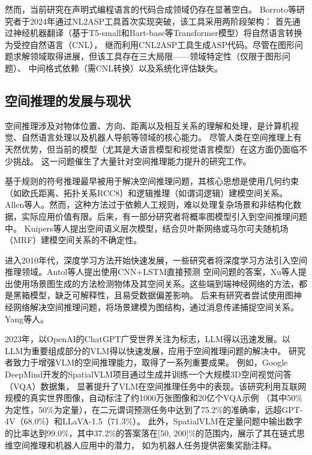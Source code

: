 然而，当前研究在声明式编程语言的代码合成领域仍存在显著空白。
Borroto等研究者于2024年通过NL2ASP工具首次实现突破，该工具采用两阶段架构：
首先通过神经机器翻译（基于T5-small和Bart-base等Transformer模型）将自然语言转换为受控自然语言（CNL），
继而利用CNL2ASP工具生成ASP代码。尽管在图形问题求解领域取得进展，但该工具存在三大局限——领域特定性（仅限于图形问题）、
中间格式依赖（需CNL转换）以及系统化评估缺失。

\subsection{空间推理的发展与现状}
空间推理涉及对物体位置、方向、距离以及相互关系的理解和处理，是计算机视觉、自然语言处理以及机器人导航等领域的核心能力。
尽管人类在空间推理上有天然优势，但当前的模型（尤其是大语言模型和视觉语言模型）在这方面仍面临不少挑战。
这一问题催生了大量针对空间推理能力提升的研究工作。

基于规则的符号推理最早被用于解决空间推理问题，其核心思想是使用几何约束（如欧氏距离、拓扑关系RCC8）和逻辑推理（如谓词逻辑）建模空间关系。
Allen等人。然而，这种方法过于依赖人工规则，难以处理复杂场景和非结构化数据，实际应用价值有限。后来，有一部分研究者将概率图模型引入到空间推理问题中。
Kuipers等人提出空间语义层次模型，结合贝叶斯网络或马尔可夫随机场（MRF）建模空间关系的不确定性。

进入2010年代，深度学习方法开始快速发展，一些研究者将深度学习方法引入空间推理领域。Antol等人\cite{Antol2015VQA}提出使用CNN+LSTM直接预测
空间问题的答案，Xu等人\cite{xu2017scene}提出使用场景图生成的方法检测物体及其空间关系。这些端到端神经网络的方法，都是黑箱模型，缺乏可解释性，且易受数据偏差影响。
后来有研究者尝试使用图神经网络解决空间推理问题，将场景建模为图结构，通过消息传递捕捉空间关系。Yang\cite{yang2018graphrcnnscenegraph}等人。

2023年，以OpenAI的ChatGPT广受世界关注为标志，LLM得以迅速发展。以LLM为重要组成部分的VLM得以快速发展，应用于空间推理问题的解决中。
研究者致力于增强VLM的空间推理能力，取得了一系列重要成果。
例如，Google DeepMind开发的SpatialVLM\cite{chen2024spatialvlmendowingvisionlanguagemodels}项目通过生成并训练一个大规模3D空间视觉问答（VQA）数据集，
显著提升了VLM在空间推理任务中的表现。该研究利用互联网规模的真实世界图像，自动标注了约1000万张图像和20亿个VQA示例
（其中50\%为定性，50\%为定量），在二元谓词预测任务中达到了75.2\%的准确率，远超GPT-4V（68.0\%）和LLaVA-1.5（71.3\%）。
此外，SpatialVLM在定量问题中输出数字的比率达到99.0\%，其中37.2\%的答案落在[50, 200]\%的范围内，展示了其在链式思维空间推理和机器人应用中的潜力，
如为机器人任务提供密集奖励注释。

